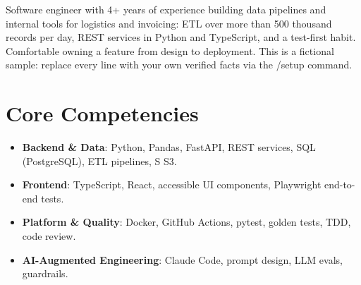 \documentclass[11pt,a4paper,sans]{moderncv}
\makeatletter
\newcommand*{\acr}[1]{\@acr#1\@nil}
\def\@acr#1#2\@nil{#1\ifx\relax#2\relax\else\kern0pt\@acr#2\@nil\fi}
\makeatother
\begin{document}
\makecvtitle


\vspace{6pt}
\small{Software engineer with 4+ years of experience building data pipelines and internal tools for logistics and invoicing: ETL over more than 500 thousand records per day, REST services in Python and TypeScript, and a test-first habit. Comfortable owning a feature from design to deployment. This is a fictional sample: replace every line with your own verified facts via the /setup command.}


\section{Core Competencies}
\vspace{1pt}
\begin{itemize}

\item \textbf{Backend \& Data}: Python, Pandas, FastAPI, REST services, SQL (PostgreSQL), ETL pipelines, \acr{AWS} S3.

\item \textbf{Frontend}: TypeScript, React, accessible UI components, Playwright end-to-end tests.

\item \textbf{Platform \& Quality}: Docker, GitHub Actions, pytest, golden tests, TDD, code review.

\item \textbf{AI-Augmented Engineering}: Claude Code, prompt design, LLM evals, guardrails.

\end{itemize}

\end{document}
